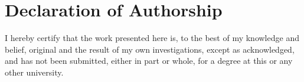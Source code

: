 \documentclass[12pt, openany]{book}
\begin{document}
\frontmatter


\fancyfoot{}
\fancyfoot[LE,RO]{\thepage}
\tableofcontents
\newpage


\onehalfspacing
\mainmatter
\fancyhead{}
\fancyhead[RO,LE]{\leftmark}
\fancyhead[RE,LO]{\rightmark}
\fancyfoot{}
\fancyfoot[LE,RO]{\thepage}

\newpage

\newpage

\newpage

\newpage

\newpage
{}
\listoffigures

\newpage
{}



\newpage
\section*{Declaration of Authorship}
\vspace{2cm}
I hereby certify that the work presented here is, to the best of my knowledge and belief, original and the result of my own investigations, except as acknowledged, and has not been submitted, either in part or whole, for a degree at this or any other university.
\\
\vspace{5cm}

\makebox[380pt][l]{
	\makebox[9cm][l] {\hrulefill}
}

\vspace{1.5cm}

\makebox[380pt][l]{
	\makebox[9cm][l] {\hrulefill}
}

\end{document}
